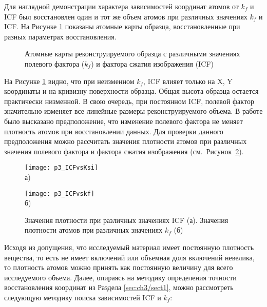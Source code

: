 Для наглядной демонстрации характера зависимостей координат атомов от $k_f$ и ICF был восстановлен один и тот же объем атомов при различных значениях $k_f$ и ICF. На Рисунке \cref{fig:p3_3Dparts} показаны атомные карты образца, восстановленные при разных параметрах восстановления.

\begin{figure}[htb]
	\caption{Атомные карты реконструируемого образца с различными значениях полевого фактора ($k_f$) и фактора сжатия изображения (ICF) \cite{scbibDensity}}
	\label{fig:p3_3Dparts}
\end{figure}

На Рисунке \cref{fig:p3_3Dparts} видно, что при неизменном $k_f$, ICF  влияет только на X, Y координаты и на кривизну поверхности образца. Общая высота образца остается практически низменной. В свою очередь, при постоянном ICF, полевой фактор значительно изменяет все линейные размеры реконструируемого объема. В работе \cite{scbibDensity} было высказано предположение, что изменение полевого фактора не меняет плотность атомов при восстановлении данных. Для проверки данного предположения можно рассчитать значения плотности атомов при различных значения полевого фактора и фактора сжатия изображения (см.~Рисунок~\cref{fig:p3_ICF}).

\begin{figure}[htb]
	\begin{minipage}[b][][b]{0.49\textwidth}\centering
		\texttt{[image: p3\_ICFvsKsi]} \\ а)
	\end{minipage}
	\begin{minipage}[b][][b]{0.49\textwidth}\centering
		\texttt{[image: p3\_ICFvskf]} \\ б)
	\end{minipage}
	\caption{Значения плотности при различных значениях ICF (а). Значения плотности атомов при различных значениях $k_f$ (б) \cite{scbibDensity}}
	\label{fig:p3_ICF}
\end{figure}

Исходя из допущения, что исследуемый материал имеет постоянную плотность вещества, то есть не имеет включений или объемная доля включений невелика, то плотность атомов можно принять как постоянную величину для всего исследуемого объема. Далее, опираясь на методику определения точности восстановления координат из Раздела \cref{sec:ch3/sect1}, можно рассмотреть следующую методику поиска зависимостей ICF и $k_f$:

